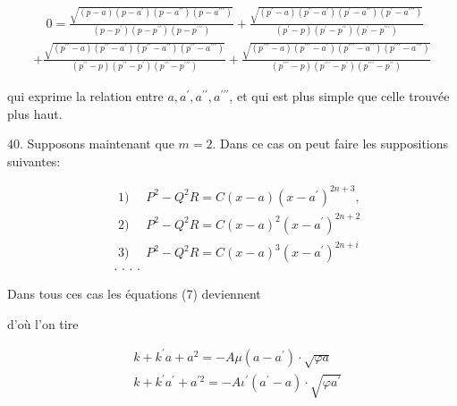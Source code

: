 \documentclass{article}
\begin{document}
\[
\begin{gathered}
\quad 0=\frac{\sqrt{(p-a)\left(p-a^{\prime}\right)\left(p-a^{\prime \prime}\right)\left(p-a^{\prime \prime \prime}\right)}}{\left(p-p^{\prime}\right)\left(p-p^{\prime \prime}\right)\left(p-p^{\prime \prime \prime}\right)}+\frac{\sqrt{\left(p^{\prime}-a\right)\left(p^{\prime}-a^{\prime}\right)\left(p^{\prime}-a^{\prime \prime}\right)\left(p^{\prime}-a^{\prime \prime \prime}\right)}}{\left(p^{\prime}-p\right)\left(p^{\prime}-p^{\prime \prime}\right)\left(p^{\prime}-p^{\prime \prime \prime}\right)} \\
+\frac{\sqrt{\left(p^{\prime \prime}-a\right)\left(p^{\prime \prime}-a^{\prime}\right)\left(p^{\prime \prime}-a^{\prime \prime}\right)\left(p^{\prime \prime}-a^{\prime \prime \prime}\right)}}{\left(p^{\prime \prime}-p\right)\left(p^{\prime \prime}-p^{\prime}\right)\left(p^{\prime \prime}-p^{\prime \prime \prime}\right)}+\frac{\sqrt{\left(p^{\prime \prime \prime}-a\right)\left(p^{\prime \prime \prime}-a^{\prime}\right)\left(p^{\prime \prime \prime}-a^{\prime \prime}\right)\left(p^{\prime \prime \prime}-a^{\prime \prime \prime}\right)}}{\left(p^{\prime \prime \prime}-p\right)\left(p^{\prime \prime \prime}-p^{\prime}\right)\left(p^{\prime \prime \prime}-p^{\prime \prime}\right)}
\end{gathered}
\]

qui exprime la relation entre \(a, a^{\prime}, a^{\prime \prime}, a^{\prime \prime \prime}\), et qui est plus simple que celle trouvée plus haut.

40. Supposons maintenant que \(m=2\). Dans ce cas on peut faire les suppositions suivantes:

\[
\begin{aligned}
& \text { 1) } \quad P^{2}-Q^{2} R=C(x-a)\left(x-a^{\prime}\right)^{2 n+3}, \\
& \text { 2) } \quad P^{2}-Q^{2} R=C(x-a)^{2}\left(x-a^{\prime}\right)^{2 n+2} \\
& \text { 3) } \quad P^{2}-Q^{2} R=C(x-a)^{3}\left(x-a^{\prime}\right)^{2 n+i} \\
& \text {. . . . }
\end{aligned}
\]

Dans tous ces cas les équations (7) deviennent

d'où l'on tire

\[
\begin{aligned}
& k+k^{\prime} a+a^{2}=-A \mu\left(a-a^{\prime}\right) \cdot \sqrt{\varphi a} \\
& k+k^{\prime} a^{\prime}+a^{\prime 2}=-A \iota^{\prime}\left(a^{\prime}-a\right) \cdot \sqrt{\varphi a^{\prime}}
\end{aligned}
\]
\end{document}
